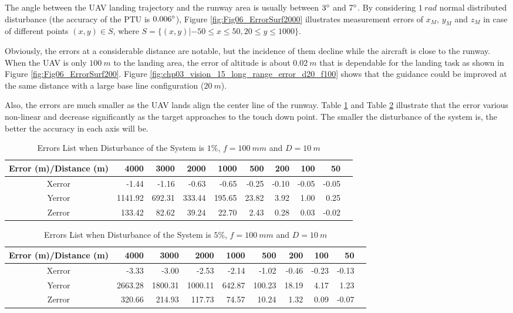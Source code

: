 \documentclass[journal,article,submit,moreauthors,pdftex,10pt,a4paper]{mdpi}
\begin{document}
The angle between the UAV landing trajectory and the runway area is usually between $3 \degree$ and $7 \degree$. By considering $1\ rad$ normal distributed disturbance (the accuracy of the PTU is $0.006 \degree$), Figure \ref{fig:Fig06_ErrorSurf2000} illustrates measurement errors of $x_M$, $y_M$ and $z_M$ in case of different points $(x,y) \in S$, where $S= \{ (x,y)| -50 \leq x \leq 50, 20 \leq y \leq 1000 \}$. 

Obviously, the errors at a considerable distance are notable, but the incidence of them decline while the aircraft is close to the runway. When the UAV is only $100\ m$ to the landing area, the error of altitude is about $0.02\ m$ that is dependable for the landing task as shown in Figure \ref{fig:Fig06_ErrorSurf200}. Figure \ref{fig:chp03_vision_15_long_range_error_d20_f100} shows that the guidance could be improved at the same distance with a large base line configuration ($20\ m$). 

Also, the errors are much smaller as the UAV lands align the center line of the runway. Table \ref{label:chp03_stereo_1} and Table \ref{label:chp03_stereo_2} illustrate that the error various non-linear and decrease significantly as the target approaches to the touch down point. The smaller the disturbance of the system is, the better the accuracy in each axis will be.

\begin{table}[t]
	\centering
	\caption{Errors List when Disturbance of the System is $1\%$, $f=100\ mm$ and $D=10\ m$}
	\label{label:chp03_stereo_1}
	\begin{tabular}{crrrrrrrrr}
		\hline
		Error (m)/Distance (m)     & 4000    & 3000   & 2000     & 1000  & 500   & 200   & 100   & 50     \\ \hline
		Xerror  & -1.44   & -1.16  & -0.63  & -0.65   & -0.25 & -0.10 & -0.05 & -0.05\\ 
		Yerror  & 1141.92 & 692.31 & 333.44 & 195.65  & 23.82 & 3.92  & 1.00  & 0.25   \\
		Zerror  & 133.42  & 82.62  & 39.24  & 22.70   & 2.43  & 0.28  & 0.03  & -0.02  \\ \hline		
	\end{tabular}
\end{table}

\begin{table}[t]
	\centering
	\caption{Errors List when Disturbance of the System is $5\%$, $f=100\ mm$ and $D=10\ m$}
	\label{label:chp03_stereo_2}
	\begin{tabular}{crrrrrrrrr}
		\hline
		Error (m)/Distance (m)     & 4000    & 3000    & 2000      & 1000  & 500    & 200   & 100   & 50    \\ \hline
		Xerror  & -3.33   & -3.00   & -2.53   & -2.14   & -1.02  & -0.46 & -0.23 & -0.13 \\ 
		Yerror & 2663.28 & 1800.31 & 1000.11 & 642.87  & 100.23 & 18.19 & 4.17  & 1.23  \\
		Zerror & 320.66  & 214.93  & 117.73  & 74.57   & 10.24  & 1.32  & 0.09  & -0.07 \\ \hline		
	\end{tabular}
\end{table}
\end{document}
